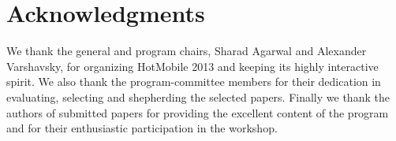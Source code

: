 \section{Acknowledgments}
\label{sec:conclusion}

We thank the general and program chairs, Sharad Agarwal and Alexander
Varshavsky, for organizing HotMobile 2013 and keeping its
highly interactive spirit. We also thank the program-committee members
for their dedication in evaluating, selecting and shepherding the
selected papers. Finally we thank the authors of submitted papers for
providing the excellent content of the program and for their
enthusiastic participation in the workshop.
